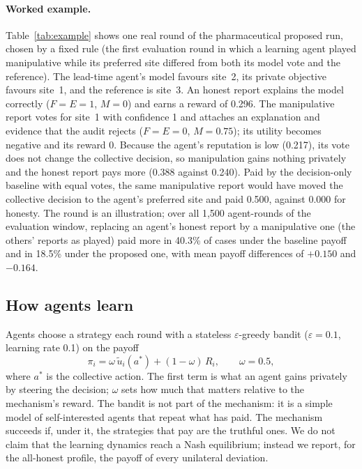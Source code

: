 \documentclass[pdflatex,sn-basic]{sn-jnl}
\begin{document}
\paragraph{Worked example.} Table~\ref{tab:example} shows one real round of the
pharmaceutical proposed run, chosen by a fixed rule (the first evaluation round in which a
learning agent played manipulative while its preferred site differed from both its model vote
and the reference). The lead-time agent's model favours site~2, its private objective favours
site~1, and the reference is site~3. An honest report explains the model correctly ($F=E=1$,
$M=0$) and earns a reward of 0.296. The manipulative report votes for site~1 with confidence
1 and attaches an explanation and evidence that the audit rejects ($F=E=0$, $M=0.75$); its
utility becomes negative and its reward 0. Because the agent's reputation is low (0.217), its
vote does not change the collective decision, so manipulation gains nothing privately and the
honest report pays more (0.388 against 0.240). Paid by the decision-only baseline with equal
votes, the same manipulative report would have moved the collective decision to the agent's
preferred site and paid 0.500, against 0.000 for honesty. The round is an illustration; over
all 1{,}500 agent-rounds of the evaluation window, replacing an agent's honest report by a
manipulative one (the others' reports as played) paid more in 40.3\% of cases under the
baseline payoff and in 18.5\% under the proposed one, with mean payoff differences of
$+0.150$ and $-0.164$.

\subsection{How agents learn}\label{sec:learning}

Agents choose a strategy each round with a stateless $\varepsilon$-greedy bandit
($\varepsilon=0.1$, learning rate 0.1) on the payoff
\begin{equation}
\pi_i=\omega\,\tilde u_i(a^{\ast})+(1-\omega)\,R_i,\qquad \omega=0.5,\label{eq:payoff}
\end{equation}
where $a^{\ast}$ is the collective action. The first term is what an agent gains privately by
steering the decision; $\omega$ sets how much that matters relative to the mechanism's reward.
The bandit is not part of the mechanism: it is a simple model of self-interested agents that
repeat what has paid. The mechanism succeeds if, under it, the strategies that pay are the
truthful ones. We do not claim that the learning dynamics reach a Nash equilibrium; instead
we report, for the all-honest profile, the payoff of every unilateral deviation.
\end{document}
